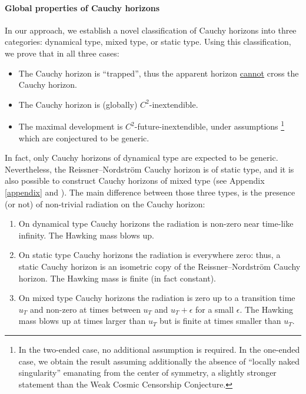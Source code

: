 \documentclass[10pt,a4paper]{article}
\theoremstyle{plain}
\theoremstyle{remark}
\theoremstyle{definition}
\theoremstyle{plain}
\theoremstyle{remark}
\theoremstyle{definition}
\numberwithin{equation}{section}
\begin{document}
 	\paragraph{Global properties of Cauchy horizons} In our approach, we establish a novel classification of Cauchy horizons into three categories: dynamical type, mixed type, or static type. Using this classification, we prove that in all three cases: \begin{itemize}
 		\item The Cauchy horizon is ``trapped'', thus the apparent horizon \underline{cannot} cross the Cauchy horizon.
 		\item The Cauchy horizon is (globally) $C^2$-inextendible.
 		\item The maximal development is $C^2$-future-inextendible, under assumptions \footnote{In the two-ended case, no additional assumption is required. In the one-ended case, we obtain the result assuming additionally the absence of ``locally naked singularity'' emanating from the center of symmetry, a slightly stronger statement than the Weak Cosmic Censorship Conjecture.} which are conjectured to be generic.
 	\end{itemize}
 	In fact, only Cauchy horizons of dynamical type are expected to be generic. Nevertheless, the Reissner--Nordstr\"{o}m Cauchy horizon is of static type, and it is also possible to construct Cauchy horizons of mixed type (see Appendix \ref{appendix} and \cite{Ori}). The main difference between those three types, is the presence (or not) of non-trivial radiation on the Cauchy horizon: \begin{enumerate}
 		\item On dynamical type Cauchy horizons the radiation is non-zero near time-like infinity\color{black}. The Hawking mass blows up.
 		\item On static type Cauchy horizons the radiation is everywhere zero: thus, \color{black} a static Cauchy horizon is an isometric copy of the Reissner--Nordstr\"{o}m Cauchy horizon. The Hawking mass is finite (in fact constant).
 		\item On mixed type Cauchy horizons the radiation is zero \color{black} up to a transition time $u_T$ and non-zero \color{black} at times between $u_T$ and $u_T+\epsilon$ for a small $\epsilon$. The Hawking mass blows up at times larger than $u_T$ but is finite at times smaller than $u_T$.
 	\end{enumerate}
\end{document}
